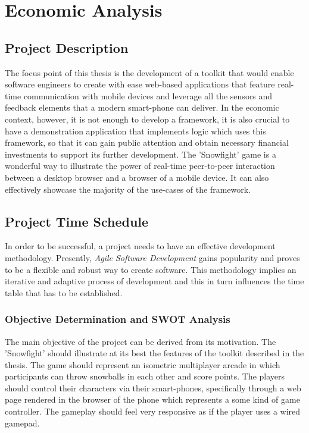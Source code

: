\section{Economic Analysis}

\subsection{Project Description}

The focus point of this thesis is the development of a toolkit that would enable software engineers to create with ease web-based applications that feature real-time communication with mobile devices and leverage all the sensors and feedback elements that a modern smart-phone can deliver. In the economic context, however, it is not enough to develop a framework, it is also crucial to have a demonstration application that implements logic which uses this framework, so that it can gain public attention and obtain necessary financial investments to support its further development. The 'Snowfight' game is a wonderful way to illustrate the power of real-time peer-to-peer interaction between a desktop browser and a browser of a mobile device. It can also effectively showcase the majority of the use-cases of the framework.

\subsection{Project Time Schedule}

In order to be successful, a project needs to have an effective development methodology. Presently, \emph{Agile Software Development} gains popularity and proves to be a flexible and robust way to create software. This methodology implies an iterative and adaptive process of development and this in turn influences the time table that has to be established.

\subsubsection{Objective Determination and SWOT Analysis}

The main objective of the project can be derived from its motivation. The 'Snowfight' should illustrate at its best the features of the toolkit described in the thesis. The game should represent an isometric multiplayer arcade in which participants can throw snowballs in each other and score points. The players should control their characters via their smart-phones, specifically through a web page rendered in the browser of the phone which represents a some kind of game controller. The gameplay should feel very responsive as if the player uses a wired gamepad.


